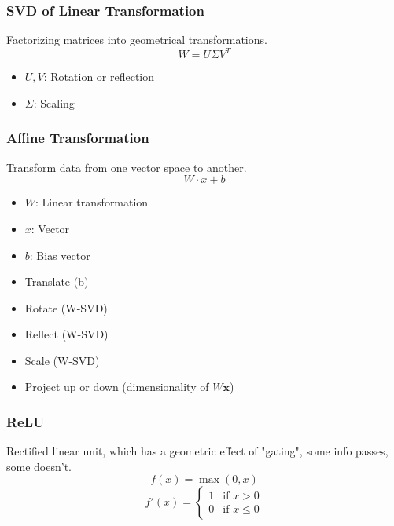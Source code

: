 \subsubsection{SVD of Linear Transformation}
\begin{notes}  
    Factorizing matrices into geometrical transformations.
    \begin{equation}
        W = U \Sigma V^T
    \end{equation}
    \begin{itemize}
        \item $U,V$: Rotation or reflection
        \item $\Sigma$: Scaling
    \end{itemize}
\end{notes}

\subsubsection{Affine Transformation}
\begin{notes} Transform data from one vector space to another.
    \begin{equation}
        W \cdot x + b
    \end{equation}
    \begin{itemize}
        \item $W$: Linear transformation
        \item $x$: Vector
        \item $b$: Bias vector
    \end{itemize}
    \vspace{1em}

    \begin{itemize}
        \item Translate (b)
        \item Rotate (W-SVD)
        \item Reflect (W-SVD)
        \item Scale (W-SVD)
        \item Project up or down (dimensionality of $W \mathbf{x}$)
    \end{itemize}
\end{notes}

\subsubsection{ReLU}
\begin{notes} Rectified linear unit, which has a geometric effect of "gating", some info passes, some doesn't.
    \begin{equation*}
        f(x) = \max(0,x)
    \end{equation*}
    \begin{equation*}
        f'(x) = \begin{cases}
            1 & \text{if } x > 0 \\
            0 & \text{if } x \leq 0
        \end{cases}
    \end{equation*}
\end{notes}

